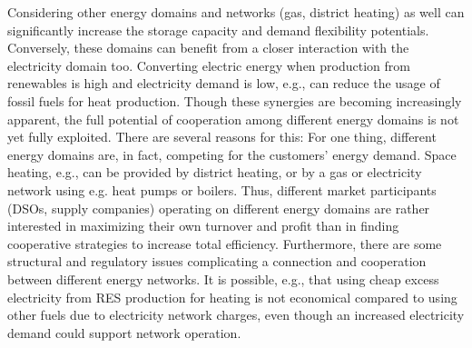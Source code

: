 \documentclass[a4paper,twoside]{article}
\begin{document}
Considering other energy domains and networks (gas, district
heating) as well can significantly increase the storage capacity and
demand flexibility potentials. Conversely, these domains can benefit
from a closer interaction with the electricity domain too. Converting
electric energy when production from renewables is high and
electricity demand is low, e.g., can reduce the usage of
fossil fuels for heat production. Though these synergies are becoming
increasingly apparent, the full potential of cooperation among
different energy domains is not yet fully exploited. There are
several reasons for this: For one thing, different energy domains are,
in fact, competing for the customers’ energy demand. Space heating, e.g.,
can be provided by district heating,  or by a gas or electricity network
using e.g. heat pumps or boilers. Thus, different market
participants (DSOs, supply companies) operating on different energy
domains are rather interested in maximizing their own turnover and
profit than in finding cooperative strategies to increase total
efficiency. Furthermore, there are some structural and regulatory
issues complicating a connection and cooperation between different
energy networks. It is possible, e.g., that using cheap excess
electricity from RES production for heating is not economical compared
to using other fuels due to electricity network charges, even though
an increased electricity demand could support network operation.

\end{document}
